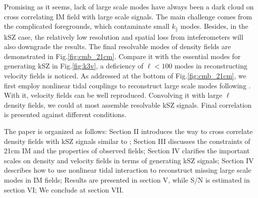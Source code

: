 Promising as it seems, 
lack of large scale modes have always been a dark cloud 
on cross correlating IM field with large scale signals. 
The main challenge comes from the complicated foregrounds, 
which contaminate small $k_\parallel$ modes. 
Besides, in the kSZ case, the relatively low resolution 
and spatial loss from inteferometers 
will also downgrade the results. 
The final resolvable modes of density fields are demonstrated in Fig.\ref{fig:cmb_21cm}.
Compare it with the essential modes for generating kSZ in Fig.\ref{fig:k3v}, 
a deficiency of $\ell<100$ modes in 
reconstructing velocity fields is noticed. 
As addressed at the bottom of Fig.\ref{fig:cmb_21cm}, 
we first employ nonlinear tidal couplings 
to reconstruct 
large scale modes following \cite{2012:pen,2015:zhu}. 
With it, velocity fields can be well reproduced. 
Convolving it with 
large $\ell$ density fields, 
we could at most assemble resolvable kSZ signals. 
Final correlation is presented against different conditions.

The paper is organized as follows: 
Section II introduces the way to 
cross correlate density fields with kSZ signals similar to \cite{Shao11}; 
Section III discusses the constraints of 21cm IM and the properties of observed fields; 
Section IV clarifies the important scales on density and velocity fields in terms of generating 
kSZ signals; 
Section IV describes how to use nonlinear tidal interaction 
to reconstruct missing large scale modes in IM fields; 
Results are presented in section V, 
while S/N is estimated in section VI; 
We conclude at section VII.

